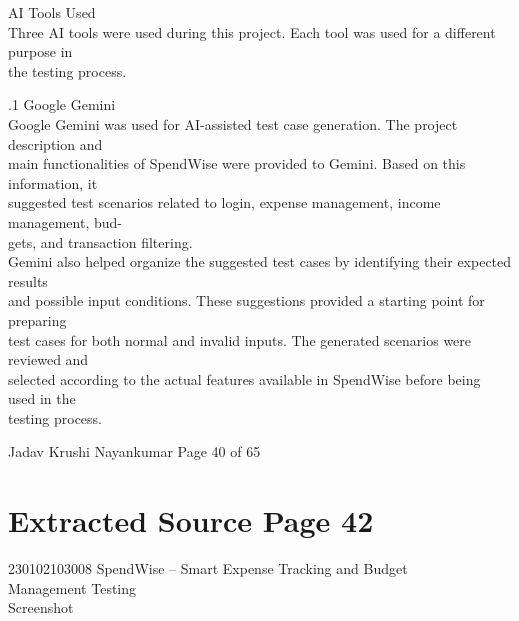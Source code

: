 \documentclass[12pt,a4paper]{report}
\begin{document}
\smallskip

 AI Tools Used\\ 

\smallskip
Three AI tools were used during this project. Each tool was used for a different purpose in\\ 
the testing process.\\ 

\smallskip

.1 Google Gemini\\ 

\smallskip
Google Gemini was used for AI-assisted test case generation. The project description and\\ 
main functionalities of SpendWise were provided to Gemini. Based on this information, it\\ 
suggested test scenarios related to login, expense management, income management, bud-\\ 
gets, and transaction filtering.\\ 
Gemini also helped organize the suggested test cases by identifying their expected results\\ 
and possible input conditions. These suggestions provided a starting point for preparing\\ 
test cases for both normal and invalid inputs. The generated scenarios were reviewed and\\ 
selected according to the actual features available in SpendWise before being used in the\\ 
testing process.\\ 

\smallskip

\smallskip

\smallskip
Jadav Krushi Nayankumar                                                         Page 40 of 65\\ 

\clearpage
\section*{Extracted Source Page 42}
230102103008                         SpendWise – Smart Expense Tracking and Budget\\ 
Management Testing\\ 

\smallskip
Screenshot\\ 

\smallskip

\smallskip
\end{document}
